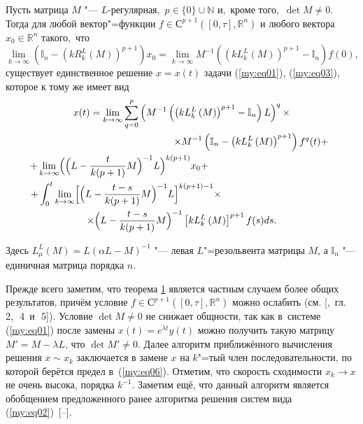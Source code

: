 \begin{theorem}[1]Пусть  матрица $M$ "---  $L$-регулярная$,$  $p\in\{0\}\cup{\mathbb N}$  и$,$
кроме того$,$ $\det M\neq0.$ Тогда для любой    вектор"=функции $f\in {\mathbb С}^{p+1} \left(\left[0,\tau\right],{\mathbb R}^{n}\right)$ и любого вектора
   $x_{0} \in {\mathbb R}^{n}$ такого$,$ что
\begin{equation}
\label{my:eq05}
\lim_{k\rightarrow \infty} \left( {\mathbb I}_{n} - \left(k R^{L}_{k} \left(M\right) \right)^{p+1}\right) x_{0} =
\lim_{k\rightarrow \infty} M^{-1} \left( \left( k L^{L}_{k}\left(M\right)\right)^{p+1} - {\mathbb I}_{n} \right) f(0),
\end{equation}
существует единственное решение $x=x(t)$ задачи {\rm (\ref{my:eq01}), (\ref{my:eq03}),} которое к тому же имеет вид
\begin{multline}\label{my:eq06}
x(t)= \lim_{k\rightarrow \infty} \sum\limits^{p}_{q=0} \left( M^{-1} \left( \left( k L^{L}_{k}\left(M\right)\right)^{p+1} - {\mathbb I}_{n} \right) L \right)^{q} \times  
\\ 
\hspace{5cm}
\times M^{-1}  \left( {\mathbb I}_{n}- \left( k L^{L}_{k}\left(M\right)\right)^{p+1} \right) f^{q} (t) +
\\
 +\lim_{k\rightarrow \infty}  \Bigl( \Bigl(L-\frac{t}{k(p+1)} M\Bigr)^{-1} L\Bigr)^{k(p+1)} x_{0}  +
 \hspace{4.5cm}
\\
 +   \int^{t}_{0}   \lim_{k\rightarrow \infty}  \Bigl[ \Bigl(L - \dfrac{t-s}{k(p+1)}M\Bigr)^{-1}  
  L\Bigr]^{k(p+1)-1}   
\times  
\hspace{4.cm}
  \\
\times    
    \Bigl(L - \dfrac{t-s}{k(p+1)}M\Bigr)^{-1}    
 \left[k L^{L}_{k}\left(M\right)\right]^{p+1}   f(s)ds.    
\end{multline}
\end{theorem}

\smallskip
Здесь $ L^{L}_{\mu}(M)=L\left(\alpha L-M\right)^{-1}$ "--- левая  $L$"=резольвента матрицы $M$, а
${\mathbb I}_{n} $ "--- единичная матрица порядка $n$.

Прежде всего заметим, что теорема \hyperlink{svir:th:1}{1} является частным случаем более общих результатов, причём условие
 $f\in {\mathbb С}^{p+1} \left(\left[0,\tau\right],{\mathbb R}^{n}\right)$ можно ослабить
 (см. \mbox{[,~гл.~\,2, \,4 и \,5])}.
 Условие  $\det M\neq0$ не снижает общности, так как в~системе (\ref{my:eq01}) после замены $x(t)=e^{\lambda t} y(t)$
 можно получить такую матрицу \mbox{$M' =M-\lambda L$}, что $\det M' \neq0$. 
 Далее алгоритм приближённого  вычисления решения $x\sim x_{k}$  \cite{SvirBr, SvirBur} заключается в замене $x$ на $k$"=тый член последовательности, по которой берётся  предел в~(\ref{my:eq06}). 
 Отметим, что скорость сходимости $x_{k} \rightarrow x$ не очень высока, порядка $k^{-1}$. Заметим ещё,
 что данный алгоритм является обобщением предложенного ранее алгоритма решения систем вида (\ref{my:eq02})~[--].

